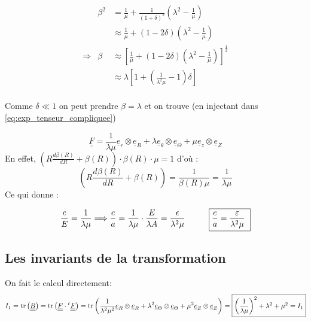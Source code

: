 \documentclass[a4paper,11pt]{article}
\newcommand{\FRAC}{\displaystyle\frac}
\begin{document}
\begin{center}
\begin{displaymath}
\begin{array}{rll}

& \beta^2 & = \FRAC{1}{\mu}+\frac{1}{\left(1+\delta\right)^2}\left(\lambda^2-\frac{1}{\mu}\right)  \\
&  & \displaystyle \approx  \frac{1}{\mu}+\left(1-2\delta\right)\left(\lambda^2-\frac{1}{\mu}\right) \\
\Rightarrow & \beta & \displaystyle \approx \left[\frac{1}{\mu} + \left(1-2\delta \right)\left(\lambda^2 -\frac{1}{\mu} \right) \right]^{\frac{1}{2}} \\
& &\displaystyle \approx \lambda\left[1+\left(\frac{1}{\lambda^2\mu}-1 \right)\delta \right]\\
\end{array}
\end{displaymath}
\end{center}

Comme $\delta \ll 1$ on peut prendre $\beta=\lambda$ et on trouve (en injectant dans \ref{eq:exp_tenseur_compliquee})

$$
\underline{\underline{F}} = \frac{1}{\lambda\mu}\underline{e}_r\otimes\underline{e}_R+\lambda\underline{e}_\theta\otimes\underline{e}_\Theta+\mu\underline{e}_z\otimes\underline{e}_Z $$
En effet,
$\left(R \FRAC{d\beta(R)}{dR} + \beta(R)\right)\cdot \beta(R) \cdot \mu = 1$ d'où :
$$
\left(R \frac{d\beta(R)}{dR} + \beta(R)\right) = \frac{1}{\beta(R) \mu} = \frac{1}{\lambda \mu}
$$
Ce qui donne :

$$ \frac{e}{E} = \frac{1}{\lambda\mu} \Longrightarrow \frac{e}{a} = \frac{1}{\lambda\mu} \cdot \frac{E}{\lambda A} = \frac{ \epsilon}{\lambda^2 \mu} \hspace{1cm} \fbox{$\FRAC{e}{a} = \FRAC{\varepsilon}{\lambda^2 \mu}$ }
$$


\subsection{Les invariants de la transformation}
On fait le calcul directement:
$$I_1=\text{tr}\left(\underline{\underline{B}}\right) = \text{tr}\left(\underline{\underline{F}}\cdot{}^{t}\underline{\underline{F}}\right) = \text{tr}\left(\frac{1}{\lambda^2\mu^2}\underline{e}_R\otimes\underline{e}_R + \lambda^2\underline{e}_\Theta\otimes\underline{e}_\Theta + \mu^2\underline{e}_Z\otimes\underline{e}_Z \right)=\fbox{$\left(\FRAC{1}{\lambda\mu}\right)^2+\lambda^2+\mu^2 = I_1$}$$
\end{document}
